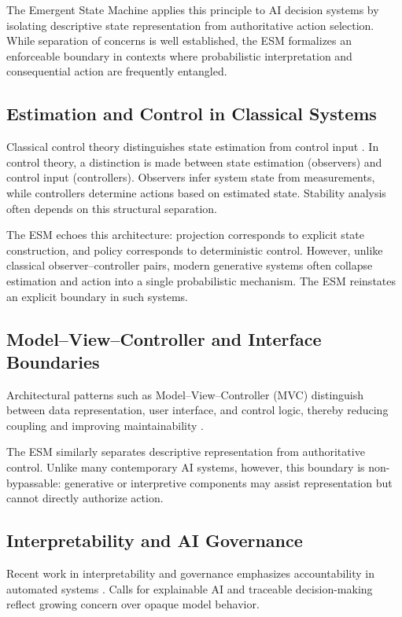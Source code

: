 \documentclass[11pt]{article}
\begin{document}
The Emergent State Machine applies this principle to AI decision systems by isolating descriptive state representation from authoritative action selection. While separation of concerns is well established, the ESM formalizes an enforceable boundary in contexts where probabilistic interpretation and consequential action are frequently entangled.

\subsection{Estimation and Control in Classical Systems}

Classical control theory distinguishes state estimation from control input \citep{kalman1960, astrom2010}. In control theory, a distinction is made between state estimation (observers) and control input (controllers). Observers infer system state from measurements, while controllers determine actions based on estimated state. Stability analysis often depends on this structural separation.

The ESM echoes this architecture: projection corresponds to explicit state construction, and policy corresponds to deterministic control. However, unlike classical observer–controller pairs, modern generative systems often collapse estimation and action into a single probabilistic mechanism. The ESM reinstates an explicit boundary in such systems.

\subsection{Model–View–Controller and Interface Boundaries}

Architectural patterns such as Model–View–Controller (MVC) distinguish between data representation, user interface, and control logic, thereby reducing coupling and improving maintainability \citep{reenskaug1979}. 

The ESM similarly separates descriptive representation from authoritative control. Unlike many contemporary AI systems, however, this boundary is non-bypassable: generative or interpretive components may assist representation but cannot directly authorize action.

\subsection{Interpretability and AI Governance}

Recent work in interpretability and governance emphasizes accountability in automated systems \citep{doshi2017, mittelstadt2016}. Calls for explainable AI and traceable decision-making reflect growing concern over opaque model behavior.
\end{document}
